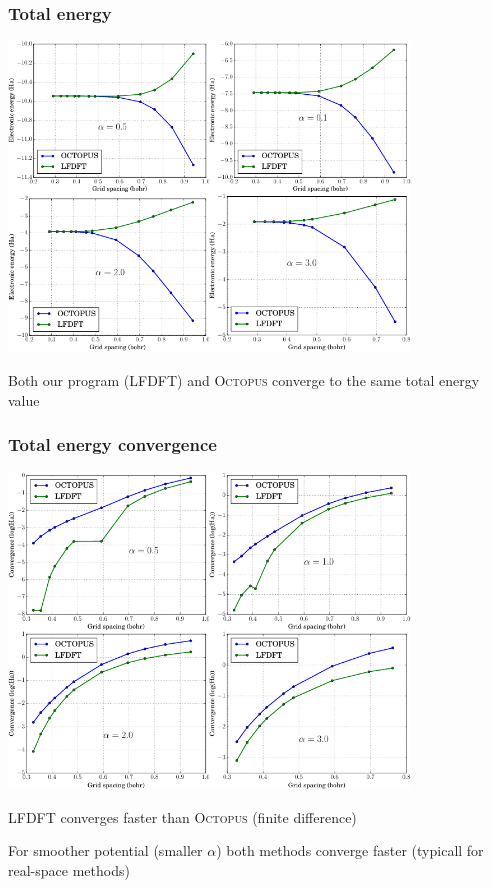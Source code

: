 \documentclass[10pt,t]{beamer}
\begin{document}
\begin{frame}
\frametitle{Total energy}  

{\centering
\includegraphics[width=0.8\textwidth]{images/COMBINE_v2.pdf}
\par
Both our program (LFDFT) and \textsc{Octopus} converge to the same total energy value
\par}

\end{frame}


\begin{frame}
\frametitle{Total energy convergence}

{\centering
\includegraphics[width=0.8\textwidth]{images/COMBINE_v1.pdf}
\par
LFDFT converges faster than \textsc{Octopus} (finite difference)
\par
For smoother potential (smaller $\alpha$) both methods converge faster
(typicall for real-space methods)
\par}

\end{frame}
\end{document}
